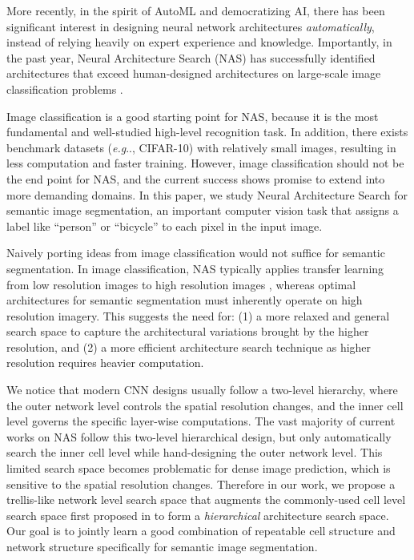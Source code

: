 \documentclass[10pt,twocolumn,letterpaper]{article}
\makeatletter
\def\@onedot{\ifx\@let@token.\else.\null\fi\xspace}
\DeclareRobustCommand\onedot{\futurelet\@let@token\@onedot}
\def\eg{\emph{e.g}\onedot} \def\Eg{\emph{E.g}\onedot}
\makeatother
\begin{document}
More recently, in the spirit of AutoML and democratizing AI, there has been significant interest in designing neural network architectures \emph{automatically}, instead of relying heavily on expert experience and knowledge.
Importantly, in the past year, Neural Architecture Search (NAS) has successfully identified architectures that exceed human-designed architectures on large-scale image classification problems \cite{zoph2017learning, liu2018progressive, real2018regularized}.

Image classification is a good starting point for NAS, because it is the most fundamental and well-studied high-level recognition task.
In addition, there exists benchmark datasets (\eg, CIFAR-10) with relatively small images, resulting in less computation and faster training. 
However, image classification should not be the end point for NAS, and the current success shows promise to extend into more demanding domains.
In this paper, we study Neural Architecture Search for semantic image segmentation, an important computer vision task that assigns a label like ``person'' or ``bicycle'' to each pixel in the input image.

Naively porting ideas from image classification would not suffice for semantic segmentation. In image classification, NAS typically applies  transfer learning from low resolution images to high resolution images \cite{zoph2017learning}, whereas optimal architectures for semantic  segmentation must inherently operate on high resolution imagery.
This suggests the need for: (1) a more relaxed and general search space to capture the architectural variations brought by the higher resolution, and (2) a more efficient architecture search technique as higher resolution requires heavier computation.



We notice that modern CNN designs \cite{he2016deep, xie2017aggreated, huang2017densely} usually follow a two-level hierarchy, where the outer network level controls the spatial resolution changes, and the inner cell level governs the specific layer-wise computations. 
The vast majority of current works on NAS \cite{zoph2017learning, liu2018progressive, real2018regularized, pham2018efficient, liu2018darts} follow this two-level hierarchical design, but only automatically search the inner cell level while hand-designing the outer network level.
This limited search space becomes problematic for dense image prediction, which is sensitive to the spatial resolution changes.
Therefore in our work, we propose a trellis-like network level search space that augments the commonly-used cell level search space first proposed in \cite{zoph2017learning} to form a \emph{hierarchical} architecture search space.
Our goal is to jointly learn a good combination of repeatable cell structure and network structure specifically for semantic image segmentation.
\end{document}
